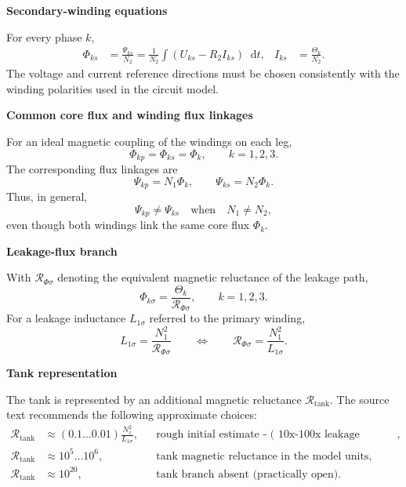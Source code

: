 \documentclass[11pt,a4paper]{article}
\newenvironment{formulaBox}[1]{%
	\par\medskip
	{\sffamily\bfseries\large\color{navy}#1}\par\nobreak\smallskip
	\def\FrameCommand{\hspace{1pt}{\color{blue}\vrule width 2.2pt}\hspace{8pt}}%
	\MakeFramed{\advance\hsize-11.2pt\FrameRestore}%
}{\endMakeFramed\par\smallskip}
\newcommand{\diff}{\mathop{}\!\mathrm{d}}
\newcommand{\Rmag}{\mathcal{R}}
\begin{document}
	\begin{formulaBox}{Secondary-winding equations}
		For every phase $k$,
		\begin{align}
			\Phi_{ks}
			&=\frac{\Psi_{ks}}{N_2}
			=\frac{1}{N_2}\int\!\left(U_{ks}-R_2I_{ks}\right)\diff t,
			& I_{ks}&=\frac{\Theta_k}{N_2}.
		\end{align}
		The voltage and current reference directions must be chosen consistently with
		the winding polarities used in the circuit model.
	\end{formulaBox}
	
	\newpage
	\thispagestyle{fancy}
	
	\begin{formulaBox}{Common core flux and winding flux linkages}
		For an ideal magnetic coupling of the windings on each leg,
		\begin{equation}
			\Phi_{kp}=\Phi_{ks}=\Phi_k,
			\qquad k=1,2,3.
		\end{equation}
		The corresponding flux linkages are
		\begin{equation}
			\Psi_{kp}=N_1\Phi_k,
			\qquad
			\Psi_{ks}=N_2\Phi_k.
		\end{equation}
		Thus, in general,
		\begin{equation}
			\Psi_{kp}\ne\Psi_{ks}\quad\text{when}\quad N_1\ne N_2,
		\end{equation}
		even though both windings link the same core flux $\Phi_k$.
	\end{formulaBox}
	
	\begin{formulaBox}{Leakage-flux branch}
		With $\Rmag_{\Phi\sigma}$ denoting the equivalent magnetic reluctance of the
		leakage path,
		\begin{equation}
			\Phi_{k\sigma}=\frac{\Theta_k}{\Rmag_{\Phi\sigma}},
			\qquad k=1,2,3.
		\end{equation}
		For a leakage inductance $L_{1\sigma}$ referred to the primary winding,
		\begin{equation}
			L_{1\sigma}=\frac{N_1^2}{\Rmag_{\Phi\sigma}}
			\qquad\Longleftrightarrow\qquad
			\Rmag_{\Phi\sigma}=\frac{N_1^2}{L_{1\sigma}}.
		\end{equation}
	\end{formulaBox}
	
	\begin{formulaBox}{Tank representation}
		The tank is represented by an additional magnetic reluctance $\Rmag_{\mathrm{tank}}$.
		The source text recommends the following approximate choices:
		\begin{align}
			\Rmag_{\mathrm{tank}}
			&\approx (0.1\ldots0.01)\frac{N_1^2}{L_{1\sigma}},
			&&\text{rough initial estimate - (~10x-100x leakage inductance)},\\
			\Rmag_{\mathrm{tank}}
			&\approx 10^5\ldots10^6,
			&&\text{tank magnetic reluctance in the model units},\\
			\Rmag_{\mathrm{tank}}
			&\approx 10^{20},
			&&\text{tank branch absent (practically open)}.
		\end{align}
	\end{formulaBox}
	
\end{document}
